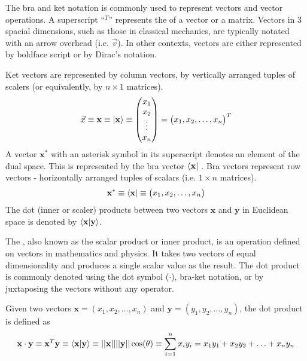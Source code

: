 The bra and ket notation is commonly used to represent vectors and vector operations. A superscript ``$^T$'' represents the  of a vector or a matrix. Vectors in 3 spacial dimensions, such as those in classical mechanics, are typically notated with an arrow overhead (i.e. $\vec{v}$). In other contexts, vectors are either represented by boldface script or by Dirac's  notation. 

\begin{defn}{1}
	Ket vectors are represented by column vectors, by vertically arranged tuples of scalers (or equivalently, by $n \times 1$ matrices).
	\begin{align}
		\vec{x} \equiv \mathbf{x} \equiv \ket{\mathbf{x}} \equiv \left(\begin{matrix}
			x_1 \\ x_2 \\ \vdots \\ x_n
		\end{matrix}\right) = \left(\begin{matrix}
		x_1, x_2, \hdots, x_n
	\end{matrix}\right)^T
	\end{align}
	A vector $\mathbf{x}^*$ with an asterisk symbol in its superscript denotes an element of the dual space. This is represented by the bra vector $\bra{\mathbf{x}}$ . Bra vectors represent row vectors - horizontally arranged tuples of scalars (i.e. $1 \times n$ matrices).
		\begin{align}
		\mathbf{x}^* \equiv \bra{\mathbf{x}} \equiv \left(\begin{matrix}
			x_1, x_2, \hdots, x_n
		\end{matrix}\right)
	\end{align}
	The dot (inner or scaler) products between two vectors $\mathbf{x}$ and $\mathbf{y}$ in Euclidean space is denoted by $\braket{\mathbf{x}|\mathbf{y}}$.
\end{defn}

The , also known as the scalar product or inner product, is an operation defined on vectors in mathematics and physics. It takes two vectors of equal dimensionality and produces a single scalar value as the result. The dot product is commonly denoted using the dot symbol ($\cdot$), bra-ket notation, or by juxtaposing the vectors without any operator.

\begin{defn}{1}
	Given two vectors $\mathbf{x}=(x_1, x_2, \hdots, x_n)$ and $\mathbf{y}=(y_1, y_2, \hdots, y_n)$, the dot product is defined as
	\begin{align}
		\mathbf{x}\cdot\mathbf{y} \equiv \mathbf{x}^T\mathbf{y} \equiv \braket{\mathbf{x}|\mathbf{y}} \equiv ||\mathbf{x}||||\mathbf{y}||\cos(\theta) \equiv \sum_{i=1}^{n} x_iy_i = x_1y_1 + x_2y_2 + \hdots + x_ny_n
	\end{align}
\end{defn}

